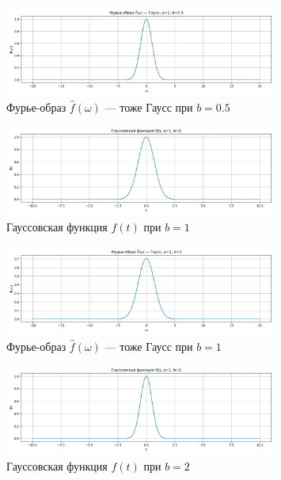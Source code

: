 \begin{figure}[H]
    \centering
    \includegraphics[width=0.8\textwidth]{gauss_spectrum_b0.5.png}
    \caption{Фурье-образ $\hat{f}(\omega)$ — тоже Гаусс при $b = 0.5$}
\end{figure}

\begin{figure}[H]
    \centering
    \includegraphics[width=0.8\textwidth]{gauss_function_b1.png}
    \caption{Гауссовская функция $f(t)$ при $b = 1$}
\end{figure}

\begin{figure}[H]
    \centering
    \includegraphics[width=0.8\textwidth]{gauss_spectrum_b1.png}
    \caption{Фурье-образ $\hat{f}(\omega)$ — тоже Гаусс при $b = 1$}
\end{figure}

\begin{figure}[H]
    \centering
    \includegraphics[width=0.8\textwidth]{gauss_function_b2.png}
    \caption{Гауссовская функция $f(t)$ при $b = 2$}
\end{figure}

